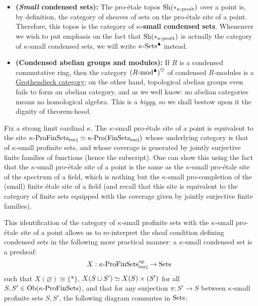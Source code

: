             \begin{example}
                \noindent
                \begin{itemize}
                    \item \textbf{(\textit{Small} condensed sets):} The pro-\'etale topos $\mathrm{Sh}(*_{\kappa\text{-}\mathrm{pro\acute{e}t}})$ over a point is, by definition, the category of sheaves of sets on the pro-\'etale site of a point. Therefore, this topos is the category of \textbf{$\kappa$-small condensed sets}. Whenenver we wish to put emphasis on the fact that $\mathrm{Sh}(*_{\kappa\text{-}\mathrm{pro\acute{e}t}})$ is actually the category of $\kappa$-small condensed sets, we will write $\kappa\text{-}\mathrm{Sets}^{\blacktriangle}$ instead.
                    \item \textbf{(Condensed abelian groups and modules):} If $R$ is a condensed commutative ring, then the category $(R\text{-}\mathrm{mod}^{\blacktriangle})^{\heartsuit}$ of condensed $R$-modules is a \href{https://ncatlab.org/nlab/show/Grothendieck+category}{\underline{Grothendieck category}}; on the other hand, topological abelian groups even fails to form an abelian category, and as we well know: no abelian categories means no homological algebra. This is a \textit{biggy}, so we shall bestow upon it the dignity of theorem-hood.
                \end{itemize}
            \end{example}
            \begin{remark} \label{remark: condensedness_and_profiniteness}
                Fix a strong limit cardinal $\kappa$. The $\kappa$-small pro-\'etale site of a point is equivalent to the site $\kappa\text{-}\mathrm{Pro}\mathrm{Fin}\mathrm{Sets}_{\mathrm{surj}} \simeq \kappa\text{-}\mathrm{Pro}(\mathrm{Fin}\mathrm{Sets}_{\mathrm{surj}})$ whose underlying category is that of $\kappa$-small profinite sets, and whose coverage is generated by jointly surjective finite families of functions (hence the subscript). One can show this using the fact that the $\kappa$-small pro-\'etale site of a point is the same as the $\kappa$-small pro-\'etale site of the spectrum of a field, which is nothing but the $\kappa$-small pro-completion of the (small) finite \'etale site of a field (and recall that this site is equivalent to the category of finite sets equipped with the coverage given by jointly surjective finite families). 
                
                This identification of the category of $\kappa$-small profinite sets with the $\kappa$-small pro-\'etale site of a point allows us to re-interpret the sheaf condition defining condensed sets in the following more practical manner: a $\kappa$-small condensed set is a presheaf:
                    $$X: \kappa\text{-}\mathrm{Pro}\mathrm{Fin}\mathrm{Sets}_{\mathrm{surj}}^{\mathrm{op}} \to \mathrm{Sets}$$
                such that $X(\varnothing) \cong \{*\}$, $X(S \sqcup S') \cong X(S) \x (S')$ for all $S, S' \in \mathrm{Ob}(\kappa\text{-}\mathrm{Pro}\mathrm{Fin}\mathrm{Sets})$, and that for any surjection $\pi: S' \to S$ between $\kappa$-small profinite sets $S, S'$, the following diagram commutes in $\mathrm{Sets}$:
            \end{remark}
            
